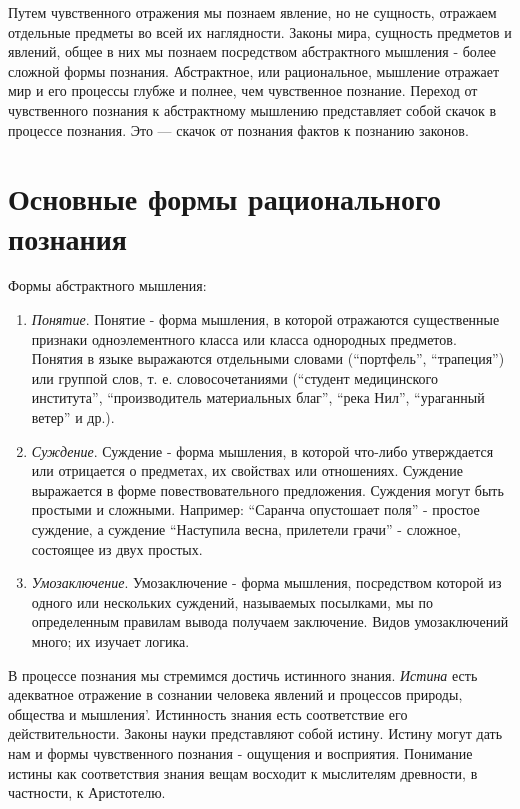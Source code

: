 \documentclass[12pt]{article}
\begin{document}
Путем чувственного отражения мы познаем явление, но не сущ­ность, отражаем отдельные предметы во всей их наглядности.
Законы мира, сущность предметов и явлений, общее в них мы познаем посредством абстрактного мышления - более сложной формы познания.
Абстрактное, или рациональное, мышление от­ражает мир и его процессы глубже и полнее, чем чувственное познание.
Переход от чувственного познания к абстрактному мыш­лению представляет собой скачок в процессе познания.
Это --- скачок от познания фактов к познанию законов.


\newpage
\section{Основные формы рационального познания}

Формы абстрактного мышления:
\begin{enumerate}
\item \textit{Понятие}.
	Понятие - форма мышления, в которой отражаются сущест­венные признаки одноэлементного класса или класса однород­ных предметов.
	Понятия в языке выражаются отдельными сло­вами (“портфель”, “трапеция”) или группой слов, т. е. словосо­четаниями (“студент медицинского института”, “производитель материальных благ”, “река Нил”, “ураганный ветер” и др.).
\item \textit{Суждение}.
	Суждение - форма мышления, в которой что-либо утвержда­ется или отрицается о предметах, их свойствах или отношениях. 
	Суждение выражается в форме повествовательного предложения.
	Суждения могут быть простыми и сложными. Например:
	“Саранча опустошает поля” - простое суждение, а суждение “Наступила весна, прилетели грачи” - сложное, состоящее из двух простых.
\item \textit{Умозаключение}.
	Умозаключение - форма мышления, посредством которой из одного или нескольких суждений, называемых посылками, мы по определенным правилам вывода получаем заключение. Видов умо­заключений много; их изучает логика.
\end{enumerate}

В процессе познания мы стремимся достичь истинного зна­ния.
\textit{Истина} есть адекватное отражение в сознании человека яв­лений и процессов природы, общества и мышления'.
Истинность знания есть соответствие его действительности.
Законы науки представляют собой истину. Истину могут дать нам и формы чувственного познания - ощущения и восприятия.
Понимание истины как соответствия знания вещам восходит к мыслителям древности, в частности, к Аристотелю.
\end{document}
